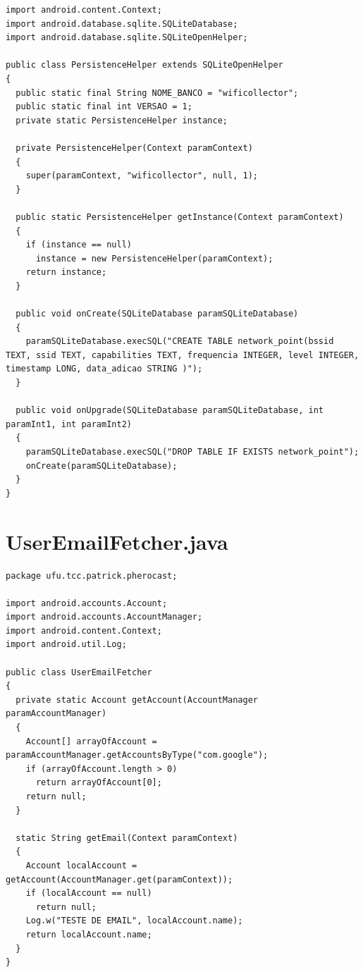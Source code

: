 \documentclass[12pt, %
openright, 
oneside,
a4paper,
brazil]{facom-ufu-abntex2}
\begin{document}
\begin{anexosenv}
\begin{lstlisting}
import android.content.Context;
import android.database.sqlite.SQLiteDatabase;
import android.database.sqlite.SQLiteOpenHelper;

public class PersistenceHelper extends SQLiteOpenHelper
{
  public static final String NOME_BANCO = "wificollector";
  public static final int VERSAO = 1;
  private static PersistenceHelper instance;

  private PersistenceHelper(Context paramContext)
  {
    super(paramContext, "wificollector", null, 1);
  }

  public static PersistenceHelper getInstance(Context paramContext)
  {
    if (instance == null)
      instance = new PersistenceHelper(paramContext);
    return instance;
  }

  public void onCreate(SQLiteDatabase paramSQLiteDatabase)
  {
    paramSQLiteDatabase.execSQL("CREATE TABLE network_point(bssid TEXT, ssid TEXT, capabilities TEXT, frequencia INTEGER, level INTEGER, timestamp LONG, data_adicao STRING )");
  }

  public void onUpgrade(SQLiteDatabase paramSQLiteDatabase, int paramInt1, int paramInt2)
  {
    paramSQLiteDatabase.execSQL("DROP TABLE IF EXISTS network_point");
    onCreate(paramSQLiteDatabase);
  }
}

\end{lstlisting}
\section{UserEmailFetcher.java}
\begin{lstlisting}
package ufu.tcc.patrick.pherocast;

import android.accounts.Account;
import android.accounts.AccountManager;
import android.content.Context;
import android.util.Log;

public class UserEmailFetcher
{
  private static Account getAccount(AccountManager paramAccountManager)
  {
    Account[] arrayOfAccount = paramAccountManager.getAccountsByType("com.google");
    if (arrayOfAccount.length > 0)
      return arrayOfAccount[0];
    return null;
  }

  static String getEmail(Context paramContext)
  {
    Account localAccount = getAccount(AccountManager.get(paramContext));
    if (localAccount == null)
      return null;
    Log.w("TESTE DE EMAIL", localAccount.name);
    return localAccount.name;
  }
}

\end{lstlisting}

\end{anexosenv}


\printindex
\end{document}
